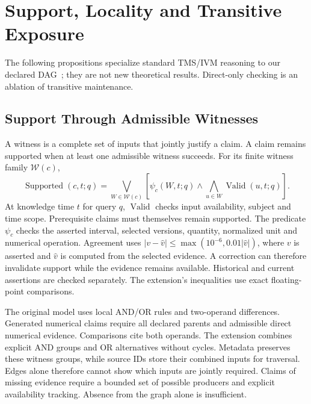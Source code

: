 \documentclass[runningheads]{llncs}
\begin{document}




\section{Support, Locality and Transitive Exposure}
\label{sec:theory}
The following propositions specialize standard TMS/IVM reasoning to our declared
DAG~\cite{doyle1979,gupta1993,dekleer1986}; they are not new theoretical results.
Direct-only checking is an ablation of transitive maintenance.

\subsection{Support Through Admissible Witnesses}

A witness is a complete set of inputs that jointly justify a claim.
A claim remains supported when at least one admissible witness succeeds.
For its finite witness family $\mathcal W(c)$,
\begin{equation}
 \operatorname{Supported}(c,t;q)=
 \bigvee_{W\in\mathcal W(c)}
 \left[\psi_c(W,t;q)\land
       \bigwedge_{u\in W}\operatorname{Valid}(u,t;q)\right].
\label{eq:support}
\end{equation}
At knowledge time $t$ for query $q$, $\operatorname{Valid}$ checks input
availability, subject and time scope. Prerequisite claims must themselves
remain supported. The predicate $\psi_c$ checks the asserted interval,
selected versions, quantity, normalized unit and numerical operation.
Agreement uses $|v-\widehat v|\leq\max(10^{-6},0.01|\widehat v|)$,
where $v$ is asserted and $\widehat v$ is computed from the selected evidence.
A correction can therefore invalidate support while the evidence remains
available. Historical and current assertions are checked separately.
The extension's inequalities use exact floating-point comparisons.

The original model uses local AND/OR rules and two-operand differences.
Generated numerical claims require all declared parents and admissible
direct numerical evidence. Comparisons cite both operands.
The extension combines explicit AND groups and OR alternatives without
cycles. Metadata preserves these witness groups, while source IDs store
their combined inputs for traversal. Edges alone therefore cannot show
which inputs are jointly required. Claims of missing evidence require
a bounded set of possible producers and explicit availability tracking.
Absence from the graph alone is insufficient.
\end{document}
